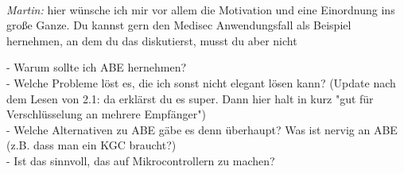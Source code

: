 




~\\

\emph{Martin: }
hier wünsche ich mir vor allem die Motivation und eine Einordnung ins große Ganze. Du kannst gern den Medisec Anwendungsfall als Beispiel hernehmen, an dem du das diskutierst, musst du aber nicht

- Warum sollte ich ABE hernehmen?\\ 
- Welche Probleme löst es, die ich sonst nicht elegant lösen kann? (Update nach dem Lesen von 2.1: da erklärst du es super. Dann hier halt in kurz "gut für Verschlüsselung an mehrere Empfänger") \\
- Welche Alternativen zu ABE gäbe es denn überhaupt? Was ist nervig an ABE (z.B. dass man ein KGC braucht?)\\
- Ist das sinnvoll, das auf Mikrocontrollern zu machen? \\

